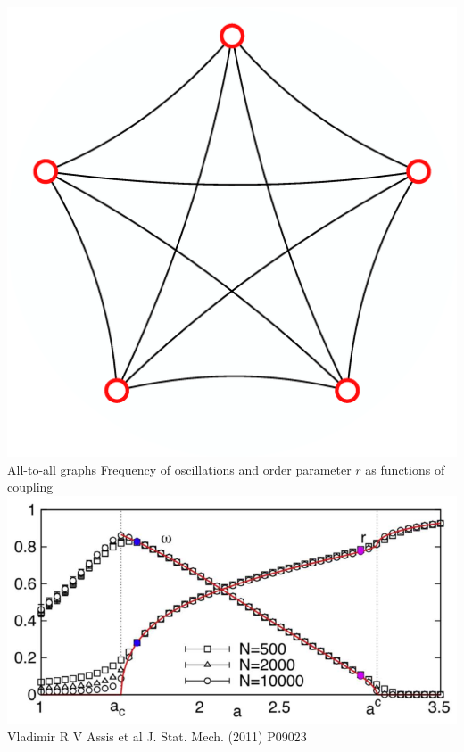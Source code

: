 \documentclass[serif,mathserif]{beamer}
\begin{document}
\begin{frame}{\includegraphics[height=0.06\textheight]{ring-complete-thumb.eps}\hspace{0.25cm} All-to-all graphs}
    \centering
    Frequency of oscillations and order parameter $r$ as functions of coupling\\
    \vspace{0.4cm}
    \includegraphics[height=0.6\textheight]{rvsa.eps}\\
    Vladimir R V Assis et al J. Stat. Mech. (2011) P09023
\end{frame}
\end{document}
